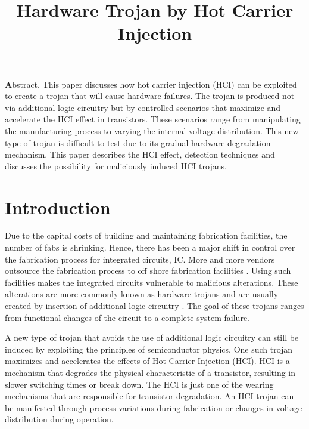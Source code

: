 \documentclass[12pt,conference]{IEEEtran}
\begin{document}
\title{Hardware Trojan by Hot Carrier Injection}
\author{
\and
{}
}
\maketitle
{\textbf Abstract.} 
This paper discusses how hot carrier injection (HCI) can be exploited
to create a trojan that will cause hardware failures.
The trojan is produced not via additional logic circuitry but
by controlled scenarios that maximize and accelerate
the HCI effect in transistors.
These scenarios range from manipulating the manufacturing
process to varying the internal voltage distribution.
This new type of trojan is difficult to test
due to its gradual hardware degradation mechanism.
This paper describes the HCI effect, detection techniques and
discusses the possibility for maliciously induced HCI trojans.


\section*{Introduction}
Due to the capital costs of building and maintaining fabrication
facilities, the number of fabs is shrinking. 
Hence, there has been a major shift in control
over the fabrication process for integrated circuits, IC.
More and more vendors outsource the fabrication process to
off shore fabrication facilities \cite{TROJANPROB08A}.
Using such facilities makes the integrated circuits vulnerable
to malicious alterations.  These alterations are more commonly
known as hardware trojans and are usually created by insertion
of additional logic circuitry \cite{HOST08a,HOST08b,HOST08c,HOST08e,HOST08g,DATE08}. The goal of these trojans ranges from
functional changes of the circuit to a complete system failure.


A new type of trojan that avoids the use of additional logic circuitry can still be induced by
exploiting the principles of semiconductor physics.
One such trojan maximizes and accelerates
the effects of Hot Carrier Injection (HCI).
HCI is a mechanism that degrades the physical characteristic of a
transistor, resulting in slower switching times or break down.
The HCI is just one of the wearing mechanisms that are responsible
for transistor degradation.
An HCI trojan can be manifested through process variations during
fabrication or changes in voltage distribution during operation.
\end{document}
